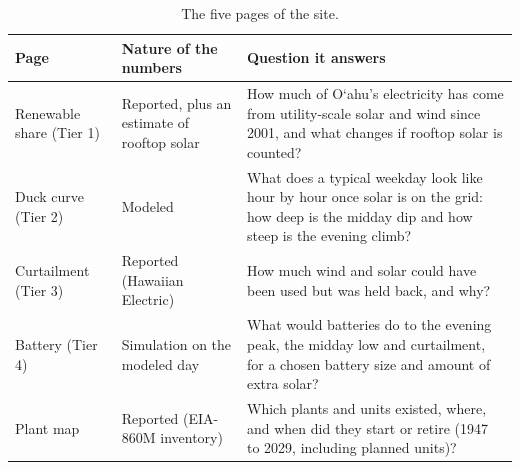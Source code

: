 \documentclass[11pt,a4paper]{article}
\newcommand{\okina}{\textquoteleft}
\newcommand{\Oahu}{\texorpdfstring{O\okina ahu}{Oahu}}
\begin{document}
\begin{table}[htbp]
\centering\small
\begin{tabularx}{\textwidth}{@{}l>{\raggedright\arraybackslash}p{3.3cm}X@{}}
\toprule
Page & Nature of the numbers & Question it answers \\
\midrule
Renewable share (Tier 1) & Reported, plus an estimate of rooftop solar & How much of \Oahu's electricity has come from utility-scale solar and wind since 2001, and what changes if rooftop solar is counted? \\
Duck curve (Tier 2) & Modeled & What does a typical weekday look like hour by hour once solar is on the grid: how deep is the midday dip and how steep is the evening climb? \\
Curtailment (Tier 3) & Reported (Hawaiian Electric) & How much wind and solar could have been used but was held back, and why? \\
Battery (Tier 4) & Simulation on the modeled day & What would batteries do to the evening peak, the midday low and curtailment, for a chosen battery size and amount of extra solar? \\
Plant map & Reported (EIA-860M inventory) & Which plants and units existed, where, and when did they start or retire (1947 to 2029, including planned units)? \\
\bottomrule
\end{tabularx}
\caption{The five pages of the site.}
\end{table}
\end{document}
